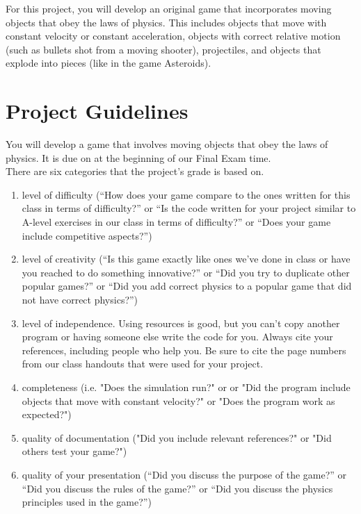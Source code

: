 

\longgoal

For this project, you will develop an original game that incorporates moving objects that obey the laws of physics. This includes objects that move with constant velocity or constant acceleration, objects with correct relative motion (such as bullets shot from a moving shooter), projectiles, and objects that explode into pieces (like in the game Asteroids).

\section*{Project Guidelines}

You will develop a game that involves moving objects that obey the laws of physics. It is due on at the beginning of our Final Exam time.\\

\noindent
There are six categories that the project's grade is based on.

\begin{enumerate}
	\item level of difficulty (``How does your game compare to the ones written for this class in terms of difficulty?'' or ``Is the code written for your project similar to A-level exercises in our class in terms of difficulty?'' or ``Does your game include competitive aspects?'')
	\item level of creativity (``Is this game exactly like ones we've done in class or have you reached to do something innovative?'' or ``Did you try to duplicate other popular games?'' or ``Did you add correct physics to a popular game that did not have correct physics?'')
	\item level of independence.  Using resources is good, but you can't copy another program or having someone else write the code for you. Always cite your references, including people who help you. Be sure to cite the page numbers from our class handouts that were used for your project. 
	\item completeness (i.e.  "Does the simulation run?" or  or "Did the program include objects that move with constant velocity?" or "Does the program work as expected?")
	\item quality of documentation ("Did you include relevant references?" or "Did others test your game?")
	\item quality of your presentation (``Did you discuss the purpose of the game?'' or ``Did you discuss the rules of the game?'' or ``Did you discuss the physics principles used in the game?'')
\end{enumerate}

